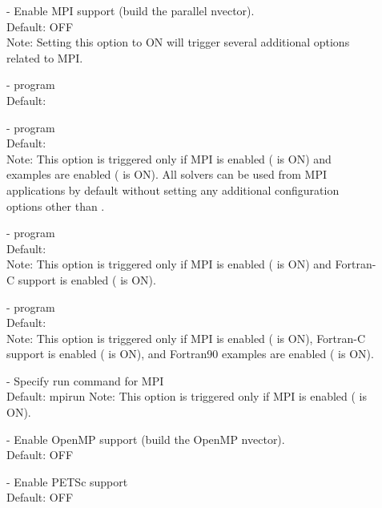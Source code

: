 \begin{description}
\item[] -  
  Enable MPI support (build the parallel nvector).
  \\
  Default: OFF 
  \\
  Note: Setting this option to ON will trigger several additional options
  related to MPI.
\item[] - 
   program
  \\
  Default: 
\item[] - 
   program
  \\
  Default: 
  \\
  Note: This option is triggered only if MPI is enabled
  ( is ON) and {\CPP} examples are enabled
  ( is ON). All {\sundials}
  solvers can be used from {\CPP} MPI applications by default
  without setting any additional configuration options other than
  .
\item[] - 
   program
  \\
  Default: 
  \\
  Note: This option is triggered only if MPI is enabled
  ( is ON) and Fortran-C support is enabled
  ( is ON). 
\item[] - 
   program
  \\
  Default: 
  \\
  Note: This option is triggered only if MPI is enabled
  ( is ON), Fortran-C support is enabled
  ( is ON), and Fortran90 examples are enabled
  ( is ON).
\item[] -  
  Specify run command for MPI  
  \\
  Default: mpirun 
  Note: This option is triggered only if MPI is enabled
  ( is ON).
\item[] -
  Enable OpenMP support (build the OpenMP nvector).
  \\
  Default: OFF 
\item[] - 
  Enable PETSc support
  \\
  Default: OFF 
  \\

\end{description}
